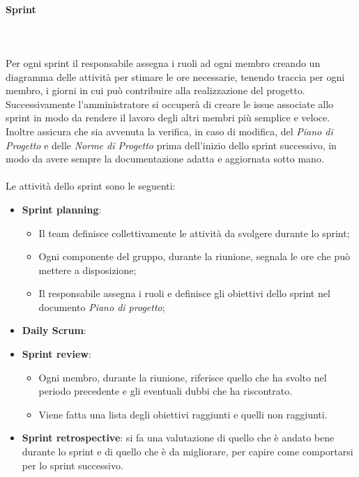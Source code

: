             \paragraph*{Sprint} ~\\\\
            Per ogni sprint il responsabile assegna i ruoli ad ogni membro creando un diagramma delle attività per stimare le ore necessarie, tenendo traccia per ogni membro, i giorni
            in cui può contribuire alla realizzazione del progetto.
            Successivamente l'amministratore si occuperà di creare le issue associate allo sprint in modo da rendere il lavoro degli altri membri più semplice e veloce.
            Inoltre assicura che sia avvenuta la verifica, in caso di modifica, del \textit{Piano
            di Progetto} e delle \textit{Norme di Progetto} prima dell'inizio dello sprint successivo, in modo da avere sempre la
            documentazione adatta e aggiornata sotto mano.\\\\
            Le attività dello sprint sono le seguenti:
            \begin{itemize}
                \item \textbf{Sprint planning}:
                \begin{itemize}
                    \item Il team definisce collettivamente le attività da svolgere durante lo sprint;
                    \item Ogni componente del gruppo, durante la riunione, segnala le ore che può mettere a disposizione;
                    \item Il responsabile assegna i ruoli e definisce gli obiettivi dello sprint nel documento \textit{Piano di progetto};
                \end{itemize}
                \item \textbf{Daily Scrum}:
                \item \textbf{Sprint review}:
                \begin{itemize}
                    \item Ogni membro, durante la riunione, riferisce quello che ha svolto nel periodo precedente e gli eventuali dubbi che ha riscontrato.
                    \item Viene fatta una lista degli obiettivi raggiunti e quelli non raggiunti.
                \end{itemize}
                \item \textbf{Sprint retrospective}: si fa una valutazione di quello che è andato bene durante lo sprint e di
                quello che è da migliorare, per capire come comportarsi per lo sprint successivo.
            \end{itemize}

